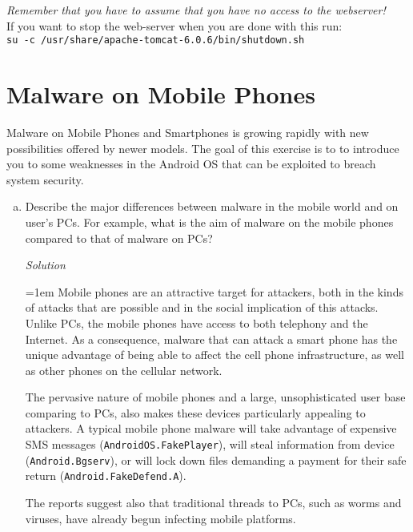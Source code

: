 \documentclass[a4paper,11pt]{article}
\newenvironment{solution}%
{\par\begin{minipage}{\linewidth}{\noindent\small\textit{Solution}\\}\begin{boxedminipage}{\linewidth}}%
{\end{boxedminipage}\end{minipage}\par\bigskip}
\begin{document}
 \textit{Remember that you have to assume that you have no access to
   the webserver!}\\
  If you want to stop the web-server when you are done with this run:\\
 \verb|su -c /usr/share/apache-tomcat-6.0.6/bin/shutdown.sh|
 

\section{Malware on Mobile Phones}
Malware on Mobile Phones and Smartphones is growing rapidly with new
possibilities offered by newer models. The goal of this exercise is to to
introduce you to some weaknesses in the Android OS that can be exploited to
breach system security. 

\begin{enumerate} [(a)]
\item Describe the major differences between malware in the mobile
  world and on user's PCs. For example, what is the aim of malware on
  the mobile phones compared to that of malware on PCs?
\ifsolution\begin{solution}
\parindent=1em
Mobile phones are an attractive target for attackers, both in the kinds of attacks that are possible and in the social implication of this attacks. Unlike PCs, the mobile phones have access to both telephony and the Internet. As a consequence, malware that can attack a smart phone has the unique advantage of being able to affect the cell phone infrastructure, as well as other phones on the cellular network. 

The pervasive nature of mobile phones and a large, unsophisticated user base comparing to PCs, also makes these devices particularly appealing to attackers. A typical mobile phone malware will take advantage of expensive SMS messages (\verb|AndroidOS.FakePlayer|), will steal information from device (\verb|Android.Bgserv|), or will lock down files demanding a payment for their safe return (\verb|Android.FakeDefend.A|). 

The reports suggest also that traditional threads to PCs, such as worms and viruses, have already begun infecting mobile platforms. 
\end{solution}\fi


\end{enumerate}
\end{document}

